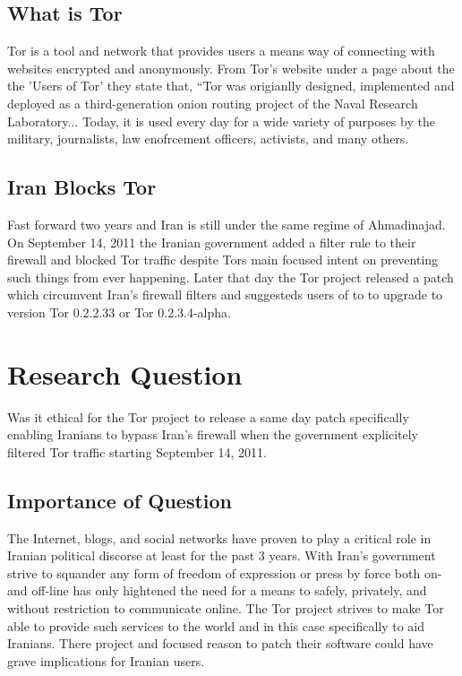 \documentclass[11pt]{article}
\begin{document}
\begin{multicols}{2}
\subsection{What is Tor}

Tor is a tool and network that provides users a means way of connecting with
websites encrypted and anonymously. From Tor's website under a page about the
the 'Users of Tor' they state that, ``Tor was origianlly designed, implemented
and deployed as a third-generation onion routing project of the Naval Research
Laboratory... Today, it is used every day for a wide variety of purposes by the
military, journalists, law enofrcement officers, activists, and many others.

\subsection{Iran Blocks Tor}

Fast forward two years and Iran is still under the same regime of Ahmadinajad.
On September 14, 2011 the Iranian government added a filter rule to their
firewall and blocked Tor traffic despite Tors main focused intent on preventing
such things from ever happening\cite{IranBlocksTorSameDayFix}.  Later that day
the Tor project released a patch which circumvent Iran's firewall filters and
suggesteds users of to to upgrade to version Tor 0.2.2.33 or Tor
0.2.3.4-alpha\cite{IranBlocksTorSameDayFix}.






\section{Research Question} 
Was it ethical for the Tor project to release a same day patch specifically
enabling Iranians to bypass Iran's firewall when the government explicitely
filtered Tor traffic starting September 14, 2011.

\subsection{Importance of Question}

The Internet, blogs, and social networks have proven to play a critical role in
Iranian political discorse at least for the past 3 years. With Iran's government
strive to squander any form of freedom of expression or press by force both on-
and off-line has only hightened the need for a means to safely, privately, and
without restriction to communicate online. The Tor project strives to make Tor
able to provide such services to the world and in this case specifically to aid
Iranians. There project and focused reason to patch their software could have
grave implications for Iranian users.


\end{multicols}
\end{document}
